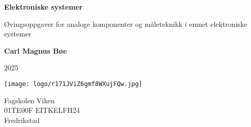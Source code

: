 \begin{titlepage}
    \begin{center}
    \vspace*{1cm}
    \Huge
    \textbf{Elektroniske systemer}
    
    \LARGE
    \vspace{0.5cm}
    Øvingsoppgaver for analoge komponenter og måleteknikk i emnet elektroniske systemer

    \vspace{1.5cm}
    \textbf{Carl Magnus Bøe}
    
    2025

\vfill




    \texttt{[image: logo/r171JViZ6gmf8WXujFQw.jpg]}
    \Large
    
    Fagskolen Viken\\
    01TE00F EITKELFH24\\
    Fredrikstad\\

    \end{center}
\end{titlepage}